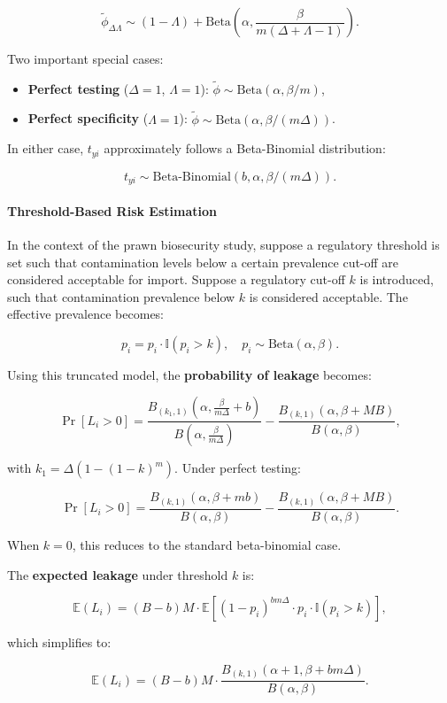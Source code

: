\documentclass[
]{article}
\providecommand{\tightlist}{%
  \setlength{\itemsep}{0pt}\setlength{\parskip}{0pt}}
\begin{document}
\[
\tilde{\phi}_{\Delta\Lambda} \sim (1 - \Lambda) + \text{Beta} \left( \alpha, \frac{\beta}{m(\Delta + \Lambda - 1)} \right).
\]

Two important special cases:

\begin{itemize}
\tightlist
\item
  \textbf{Perfect testing} (\(\Delta = 1\), \(\Lambda = 1\)):
  \(\tilde{\phi} \sim \text{Beta}(\alpha, \beta / m)\),
\item
  \textbf{Perfect specificity} (\(\Lambda = 1\)):
  \(\tilde{\phi} \sim \text{Beta}(\alpha, \beta / (m \Delta))\).
\end{itemize}

In either case, \(t_{yi}\) approximately follows a Beta-Binomial
distribution:

\[
t_{yi} \sim \text{Beta-Binomial}(b, \alpha, \beta / (m\Delta)).
\]

\paragraph{Threshold-Based Risk
Estimation}\label{threshold-based-risk-estimation}

In the context of the prawn biosecurity study, suppose a regulatory
threshold is set such that contamination levels below a certain
prevalence cut-off are considered acceptable for import. Suppose a
regulatory cut-off \(k\) is introduced, such that contamination
prevalence below \(k\) is considered acceptable. The effective
prevalence becomes:

\[
p_i = p_i \cdot \mathbb{I}(p_i > k), \quad p_i \sim \text{Beta}(\alpha, \beta).
\]

Using this truncated model, the \textbf{probability of leakage} becomes:

\[
\Pr[L_i > 0] = \frac{B_{(k_1,1)}(\alpha, \frac{\beta}{m\Delta} + b)}{B(\alpha, \frac{\beta}{m\Delta})} - \frac{B_{(k,1)}(\alpha, \beta + MB)}{B(\alpha, \beta)},
\]

with \(k_1 = \Delta(1 - (1 - k)^m)\). Under perfect testing:

\[
\Pr[L_i > 0] = \frac{B_{(k,1)}(\alpha, \beta + mb)}{B(\alpha, \beta)} - \frac{B_{(k,1)}(\alpha, \beta + MB)}{B(\alpha, \beta)}.
\]

When \(k = 0\), this reduces to the standard beta-binomial case.

The \textbf{expected leakage} under threshold \(k\) is:

\[
\mathbb{E}(L_i) = (B - b) M \cdot \mathbb{E}\left[ (1 - p_i)^{bm\Delta} \cdot p_i \cdot \mathbb{I}(p_i > k) \right],
\]

which simplifies to:

\[
\mathbb{E}(L_i) = (B - b) M \cdot \frac{B_{(k,1)}(\alpha + 1, \beta + bm\Delta)}{B(\alpha, \beta)}.
\]
\end{document}
